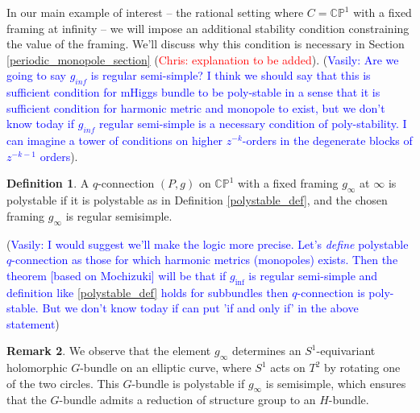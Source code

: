 \documentclass[11pt, oneside, reqno]{amsart}
\theoremstyle{definition} \newtheorem{definition}{Definition}[section]
\theoremstyle{definition} \newtheorem{remark}[definition]{Remark}
\theoremstyle{definition} \newtheorem{remarks}[definition]{Remarks}
\theoremstyle{definition} \newtheorem{question}[definition]{Question}
\theoremstyle{definition} \newtheorem*{note}{Note}
\theoremstyle{definition} \newtheorem{example}[definition]{Example}
\theoremstyle{definition} \newtheorem{examples}[definition]{Examples}
\newcommand{\bb}[1]{\mathbb{#1}}
\newcommand{\chris}[1]{(\textcolor{red}{Chris: #1})}
\newcommand{\vasily}[1]{(\textcolor{blue}{Vasily: #1})}
\begin{document}
In our main example of interest -- the rational setting where $C = \bb{CP}^1$ with a fixed framing at infinity -- we will impose an additional stability condition constraining the value of the framing.  We'll discuss why this condition is necessary in Section \ref{periodic_monopole_section} \chris{explanation to be added}.
\vasily{Are we going to say $g_{inf}$ is regular semi-simple? I think
  we should say that this is sufficient condition for mHiggs bundle
  to be poly-stable in a sense that it is sufficient condition
  for harmonic metric and monopole to exist, but we don't know
  today if $g_{inf}$ regular semi-simple is a necessary condition
  of poly-stability. I can imagine a tower of conditions on higher $z^{-k}$-orders
in the degenerate blocks of $z^{-{k-1}}$ orders}.


\begin{definition} \label{rational_stability_def}
A $q$-connection $(P,g)$ on $\bb{CP}^1$ with a fixed framing $g_\infty$ at $\infty$ is polystable if it is polystable as in Definition \ref{polystable_def}, and the chosen framing $g_\infty$ is regular semisimple.
\end{definition}

\vasily{I would suggest we'll make the logic more precise. Let's \emph{define}
  polystable $q$-connection as those for which harmonic metrics (monopoles) exists. Then the theorem [based on Mochizuki] will be that if  $g_{\inf}$ is regular semi-simple and definition like \ref{polystable_def} holds for subbundles  then  $q$-connection is poly-stable. But we don't know today if can put 'if and only if' in the above statement}
\begin{remark}
We observe that the element $g_\infty$ determines an $S^1$-equivariant holomorphic $G$-bundle on an elliptic curve, where $S^1$ acts on $T^2$ by rotating one of the two circles.  This $G$-bundle is polystable if $g_\infty$ is semisimple, which ensures that the $G$-bundle admits a reduction of structure group to an $H$-bundle.
\end{remark}
\end{document}
